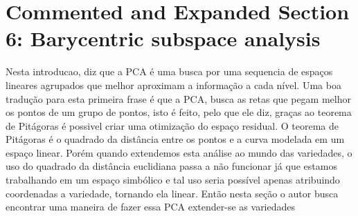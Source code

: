 \documentclass[a4paper,titlepage]{article}
\begin{document}
{\section{Commented and Expanded Section 6: Barycentric subspace analysis}


{
\vspace{1em}
\vspace{1em}
}
Nesta introducao, diz que a PCA é uma busca por uma sequencia de espaços lineares agrupados que melhor aproximam a informação a cada nível. Uma boa tradução para esta primeira frase é que a PCA, busca as retas que pegam melhor os pontos de um grupo de pontos, isto é feito, pelo que ele diz, graças ao teorema de Pitágoras é possivel criar uma otimização do espaço residual. O teorema de Pitágoras é o quadrado da distância entre os pontos e a curva modelada em um espaço linear. Porém quando extendemos esta análise ao mundo das variedades, o uso do quadrado da distância euclidiana passa a não funcionar já que estamos trabalhando em um espaço simbólico e tal uso seria possível apenas atribuindo coordenadas a variedade, tornando ela linear. Então nesta seção o autor busca encontrar uma maneira de fazer essa PCA extender-se as variedades

{
\vspace{1em}
\vspace{1em}
}

}
\end{document}
